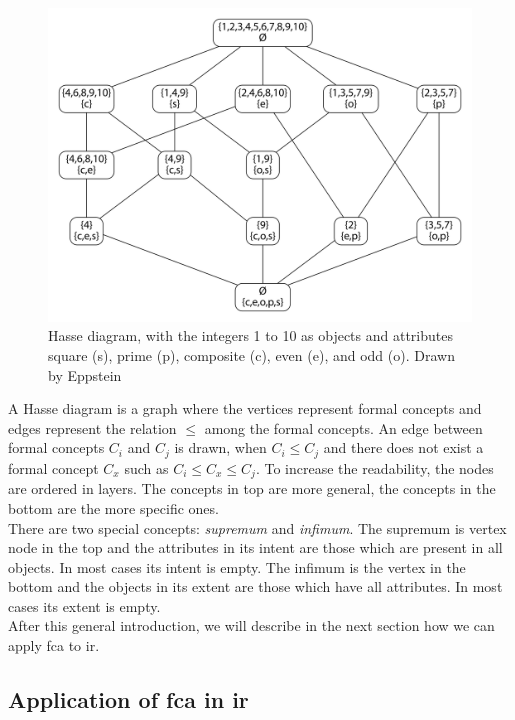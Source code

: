 \documentclass[11pt]{report}
\begin{document}
\begin{figure}[!ht]
	\centering
	\includegraphics[width=\linewidth]{./images/fcaExample}
\caption{Hasse diagram, with the integers 1 to 10 as objects and attributes square (s), prime (p), composite (c), even (e), and odd (o). Drawn by Eppstein \cite{fcaexample}}
\label{figure:example}
\end{figure}

A Hasse diagram is a graph where the vertices represent formal concepts and edges represent the relation $\le$ among the formal concepts. An edge between formal concepts $C_i$ and $C_j$ is drawn, when $C_i \le C_j$ and there does not exist a formal concept $C_x$ such as $C_i \le C_x \le C_j$. To increase the readability, the nodes are ordered in layers. The concepts in top are more general, the concepts in the bottom are the more specific ones.\\

There are two special concepts: \textit{supremum} and \textit{infimum}. The supremum is vertex node in the top and the attributes in its intent are those which are present in all objects. In most cases its intent is empty. The infimum is the vertex in the bottom and the objects in its extent are those which have all attributes. In most cases its extent is empty.\\

After this general introduction, we will describe in the next section how we can apply \acrshort{fca} to \acrshort{ir}.

\subsection{Application of \acrshort{fca} in \acrshort{ir}}
\end{document}

